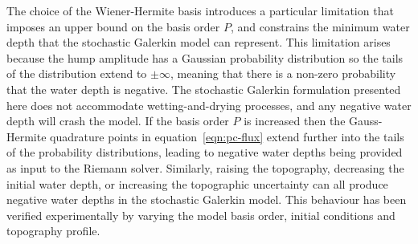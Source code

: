 The choice of the Wiener-Hermite basis introduces a particular limitation that imposes an upper bound on the basis order $P$, and constrains the minimum water depth that the stochastic Galerkin model can represent.
This limitation arises because the hump amplitude has a Gaussian probability distribution so the tails of the distribution extend to $\pm \infty$, meaning that there is a non-zero probability that the water depth is negative.
The stochastic Galerkin formulation presented here does not accommodate wetting-and-drying processes, and any negative water depth will crash the model.
If the basis order $P$ is increased then the Gauss-Hermite quadrature points in equation~\eqref{eqn:pc-flux} extend further into the tails of the probability distributions, leading to negative water depths being provided as input to the Riemann solver.
Similarly, raising the topography, decreasing the initial water depth, or increasing the topographic uncertainty can all produce negative water depths in the stochastic Galerkin model.
This behaviour has been verified experimentally by varying the model basis order, initial conditions and topography profile.

